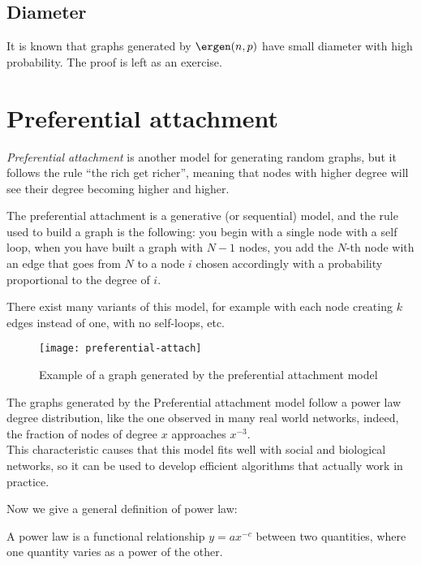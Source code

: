 \subsection{Diameter}

It is known that graphs generated by $\ergen(n,p)$ have small diameter with high probability. The proof is left as an exercise.


\section[Preferential attachment]{Preferential attachment\raisebox{.3\baselineskip}{\normalsize\footnotemark}}
\label{sec:pref-att}
    
\textit{Preferential attachment} is another model for generating random graphs, but it follows the rule ``the rich get richer'', meaning that nodes with higher degree will see their degree becoming higher and higher.

The preferential attachment is a generative (or sequential) model, and the rule used to build a graph is the following: you begin with a single node with a self loop, when you have built a graph with $N-1$ nodes, you add the $N$-th node with an edge that goes from $N$ to a node $i$ chosen accordingly with a probability proportional to the degree of $i$.

There exist many variants of this model, for example with each node creating $k$ edges instead of one, with no self-loops, etc.

\begin{figure}
    \centering
    \texttt{[image: preferential-attach]}
    \caption{Example of a graph generated by the preferential attachment model}
    \label{fig:pref-att}
\end{figure}

The graphs generated by the Preferential attachment model follow a power law degree distribution, like the one observed in many real world networks, indeed, the fraction of nodes of degree $x$ approaches $x^{-3}$.\\
This characteristic causes that this model fits well with social and biological networks, so it can be used to develop efficient algorithms that actually work in practice.

Now we give a general definition of power law:
\begin{defn}
    A power law is a functional relationship $y = ax^{-c}$ between two quantities, where one quantity varies as a power of the other.
\end{defn}

